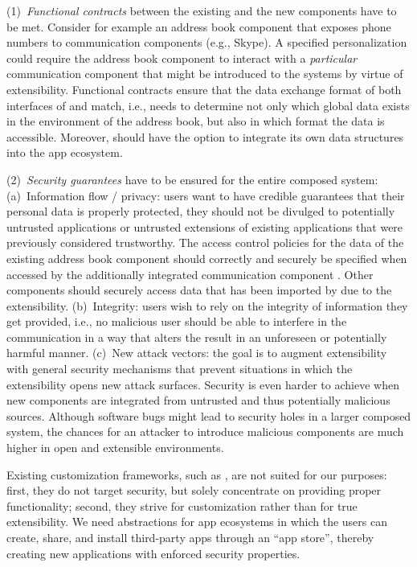 \documentclass{src/acm_proc_article-sp} \else
\begin{document}
(1)~\emph{Functional contracts} between the existing and the
new components have to be met. Consider for example an
address book component  that exposes phone numbers to
communication components (e.g., Skype). A specified
personalization could require the address book component
 to interact with a \emph{particular} communication component
 that might be introduced to the systems by virtue of
extensibility. Functional contracts ensure that the data
exchange format of both interfaces of  and  match,
i.e.,  needs to determine not only which global data
exists in the environment of the address book, but also in
which format the data is accessible. Moreover,  should
have the option to integrate its own data structures into
the app ecosystem.


(2)~\emph{Security guarantees} have to be ensured for the
entire composed system: (a)~Information flow / privacy:
users want to have credible guarantees that their personal
data is properly protected, they should not be divulged to
potentially untrusted applications or untrusted extensions
of existing applications that were previously considered
trustworthy. The access control policies for the data of the
existing address book component  should correctly and
securely be specified when accessed by the additionally
integrated communication component . Other components
should securely access data that has been imported by 
due to the extensibility. (b)~Integrity: users wish to rely
on the integrity of information they get provided, i.e., no
malicious user should be able to interfere in the
communication in a way that alters the result in an
unforeseen or potentially harmful manner. (c)~New attack
vectors: the goal is to augment extensibility with general
security mechanisms that prevent situations in which the
extensibility opens new attack surfaces.
Security is even harder to achieve when new components are
integrated from untrusted and thus potentially malicious
sources. Although software bugs might lead to security holes
in a larger composed system, the chances for an attacker to
introduce malicious components are much higher in open and
extensible environments.



Existing customization frameworks, such as
\cite{Hagemann:2010Mashups,Jansen10:CustomizationMultiTenant,Tesoriero2010:CAUCE,KOL09:WYSIWYG,Kapitsaki2009:ContextAwareWebApps,Ceri2007:ContextAwareWebApps,Bolin:2005CustRendWebPages,Rossi01:PersonalizedWebApps,Danculovic:2001PersWebApps,WebML2000a},
are not suited for our purposes: first, they do not target
security, but solely concentrate on providing proper
functionality; second, they strive for customization rather
than for true extensibility.
We need abstractions for app ecosystems in which the users
can create, share, and install third-party apps through an
``app store'', thereby creating new applications with
enforced security properties.
\end{document}
